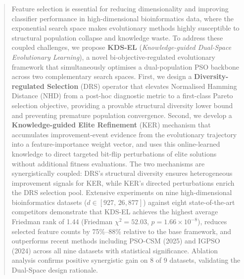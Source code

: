 

\begin{abstract}
Feature selection is essential for reducing dimensionality and improving
classifier performance in high-dimensional bioinformatics data, where
the exponential search space makes evolutionary methods highly
susceptible to structural population collapse and knowledge waste.
To address these coupled challenges, we propose \textbf{KDS-EL}
(\textit{Knowledge-guided Dual-Space Evolutionary Learning}), a novel
bi-objective-regulated evolutionary framework that simultaneously
optimises a dual-population PSO backbone across two complementary
search spaces.
First, we design a \textbf{Diversity-regulated Selection} (DRS) operator
that elevates Normalised Hamming Distance (NHD) from a post-hoc
diagnostic metric to a first-class Pareto selection objective,
providing a provable structural diversity lower bound and preventing
premature population convergence.
Second, we develop a \textbf{Knowledge-guided Elite Refinement} (KER)
mechanism that accumulates improvement-event evidence from the
evolutionary trajectory into a feature-importance weight vector,
and uses this online-learned knowledge to direct targeted bit-flip
perturbations of elite solutions without additional fitness evaluations.
The two mechanisms are synergistically coupled: DRS's structural
diversity ensures heterogeneous improvement signals for KER, while KER's
directed perturbations enrich the DRS selection pool.
Extensive experiments on nine high-dimensional bioinformatics datasets
($d \in [927,\,26{,}877]$) against eight state-of-the-art competitors
demonstrate that KDS-EL achieves the highest average Friedman rank
of 1.44 (Friedman $\chi^2=52.03$, $p=1.66\times10^{-8}$),
reduces selected feature counts by 75\%--88\% relative to the base
framework, and outperforms recent methods including PSO-CSM (2025)
and IGPSO (2024) across all nine datasets with statistical significance.
Ablation analysis confirms positive synergistic gain on 8 of 9 datasets,
validating the Dual-Space design rationale.
\end{abstract}


